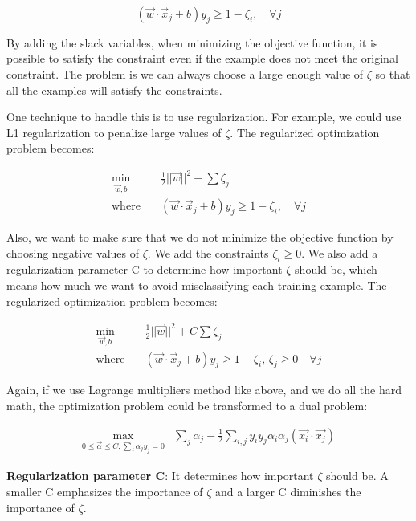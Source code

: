 \documentclass{article}
\begin{document}
\begin{equation}
(\vec{w} \cdot \vec{x}_j + b)y_j \geq 1 - \zeta_i, \quad \forall j \nonumber
\end{equation}

By adding the slack variables, when minimizing the objective function, it is possible to satisfy the constraint even if the example does not meet the original constraint. The problem is we can always choose a large enough value of $\zeta$ so that all the examples will satisfy the constraints.

One technique to handle this is to use regularization. 
For example, we could use L1 regularization to penalize large values of $\zeta$. The regularized optimization problem becomes:

\begin{align*}
\min_{\vec{w},b} & \quad \frac{1}{2} ||\vec{w}||^2  + \sum \zeta_j\\
\mathrm{where} & \quad (\vec{w} \cdot \vec{x}_j + b)y_j \geq 1 - \zeta_i, \quad \forall j
\end{align*}

Also, we want to make sure that we do not minimize the objective function by choosing negative values of $\zeta$. We add the constraints $\zeta_i \ge 0$. We also add a regularization parameter C to determine how important $\zeta$ should be, which means how much we want to avoid misclassifying each training example. The regularized optimization problem becomes:

\begin{align*}
\min_{\vec{w},b} & \quad \frac{1}{2} ||\vec{w}||^2  + C  \sum \zeta_j\\
\mathrm{where} & \quad (\vec{w} \cdot \vec{x}_j + b)y_j \geq 1 - \zeta_i, \, \zeta_j \ge 0 \quad \forall j
\end{align*}

Again, if we use Lagrange multipliers method like above, and we do all the hard math, the optimization problem could be transformed to a dual problem:

\begin{align*}
\max_{0 \leq \vec{\alpha}\leq C, \sum_j \alpha_j y_j = 0} & \sum_j \alpha_j - \frac{1}{2} \sum_{i,j} y_iy_j\alpha_i\alpha_j (\vec{x_i}\cdot \vec{x_j}) 
\end{align*}


\textbf{Regularization parameter C}:
It determines how important $\zeta$ should be. A smaller C emphasizes the importance of $\zeta$ and a larger C diminishes the importance of $\zeta$.
\end{document}
